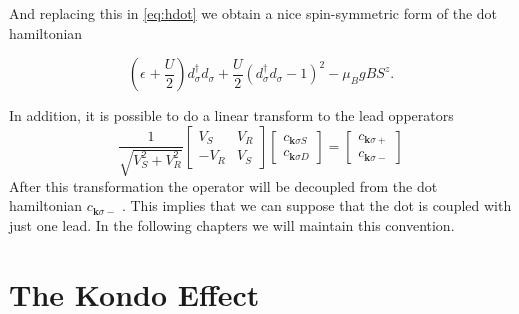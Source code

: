 \noindent And replacing this in \eqref{eq:hdot} we obtain a  nice spin-symmetric form of the dot hamiltonian

\begin{equation}
    \left(\epsilon_{}+\frac{U}{2}\right)d_{\sigma}^{\dagger}d_{\sigma}+\frac{U}{2}(d_{\sigma}^{\dagger}d_{\sigma}-1)^{2}-\mu_{B}gBS^{z}. 
    \label{eq:hdot2}
\end{equation}

In addition, it is possible to do a linear transform to the lead opperators 
\begin{equation}
    \frac{1}{\sqrt{V_{S}^{2}+V_{R}^{2}}}\left[\begin{array}{cc}
V_{S} & V_{R}\\
-V_{R} & V_{S}
\end{array}\right]\left[\begin{array}{c}
c_{\mathbf{k}\sigma S}\\
c_{\mathbf{k}\sigma D}
\end{array}\right]=\left[\begin{array}{c}
c_{\mathbf{k}\sigma+}\\
c_{\mathbf{k}\sigma-}
\end{array}\right]
\end{equation}
\noindent After this transformation the operator will be decoupled from the dot hamiltonian $c_{\mathbf{k}\sigma-}$ . This implies that we can suppose that the  dot is coupled with just one lead. In the following chapters we will maintain this convention. 


\section{The Kondo Effect \label{sec:Kondo} }


